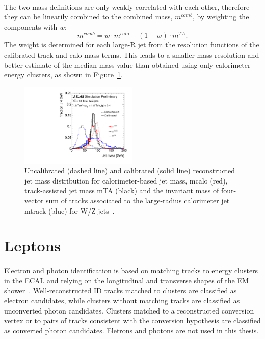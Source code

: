\paragraph{}
The two mass definitions are only weakly correlated with each other, therefore they can be linearily combined to the combined mass, $m^{comb}$, by weighting the components with $w$:
\begin{equation}
m^{comb} = w\cdot m^{calo}+(1-w)\cdot m^{TA}.
\end{equation}
The weight is determined for each large-R jet from the resolution functions of the calibrated track and calo mass terms.
This leads to a smaller mass resolution and better estimate of the median mass value than obtained using only calorimeter energy clusters, as shown in Figure~\ref{fig:Jet_mass}.

\begin{figure}[h!]
  \centering
  \captionsetup{justification=centering}
  \includegraphics[width=0.5\textwidth,angle=-90]{figures/object/Jet_mass}
   \caption{Uncalibrated (dashed line) and calibrated (solid line) reconstructed jet mass distribution for calorimeter-based jet mass, mcalo (red), track-assisted jet mass mTA (black) and the invariant mass of four-vector sum of tracks associated to the large-radius calorimeter jet mtrack (blue) for W/Z-jets~\cite{ATLAS-CONF-2016-035}.}
  \label{fig:Jet_mass}
\end{figure}

\section{Leptons}
\paragraph{}
Electron and photon identification is based on matching tracks to energy clusters in the ECAL and relying on the longitudinal and transverse shapes of the EM shower~\cite{ATLAS-CONF-2016-024}. Well-reconstructed ID tracks matched to clusters are classified as electron candidates, while clusters without matching tracks are classified as unconverted photon candidates. Clusters matched to a reconstructed conversion vertex or to pairs of tracks consistent with the conversion hypothesis are classified as converted photon candidates. Eletrons and photons are not used in this thesis.

